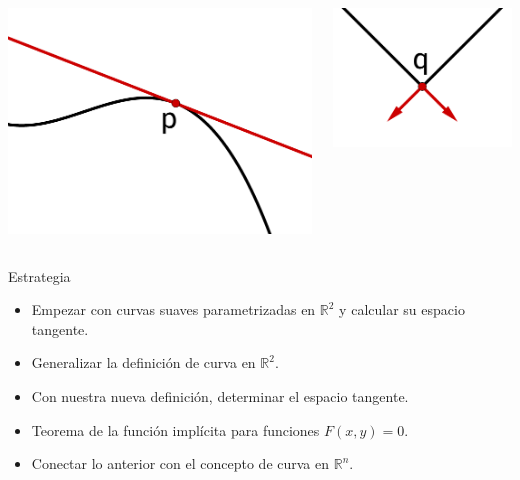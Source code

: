 \documentclass{beamer}
\def\realR{\mathbb{R}} %
\begin{document}
\begin{frame}
\begin{columns}
    \begin{center}
        \includegraphics[scale=0.25]{curva-suave}
    \end{center}
    \begin{center}
        \includegraphics[scale=0.35]{curva-no-suave}
    \end{center}
\end{columns}
\end{frame}

\begin{frame}
  \begin{block}{Estrategia}
    \begin{itemize}
        \item Empezar con curvas suaves parametrizadas en $\realR^{2}$ y calcular su espacio tangente.
        \item Generalizar la definición de curva en $\realR^{2}$.
        \item Con nuestra nueva definición, determinar el espacio tangente.
        \item Teorema de la función implícita para funciones $F(x,y) = 0$.
        \item Conectar lo anterior con el concepto de curva en $\realR^{n}$.
    \end{itemize}
  \end{block}
\end{frame}
\end{document}
